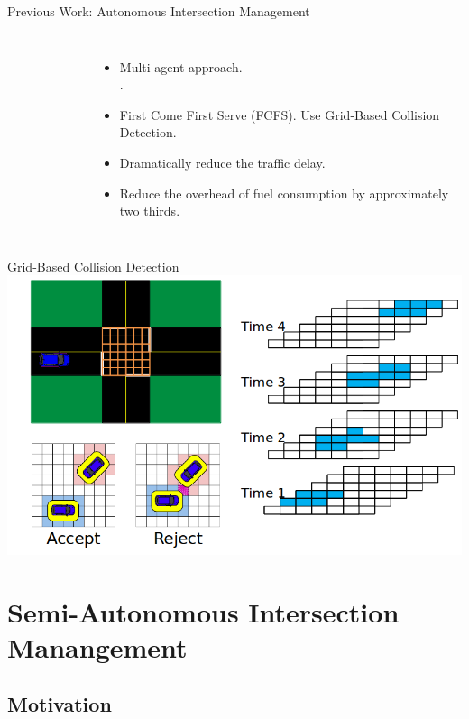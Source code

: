 \documentclass{beamer}
\begin{document}
\begin{frame}{Previous Work: Autonomous Intersection Management}
\begin{columns}[c]
		\begin{center}
		\begin{figure}
		\end{figure}
		\end{center}
				
		\begin{itemize}
		\item Multi-agent approach.\\\cite{bib:Dresner08Multiagent}.
		\item First Come First Serve (FCFS). Use Grid-Based Collision Detection.\pause
		\item Dramatically reduce the traffic delay.
		\item Reduce the overhead of fuel consumption by approximately
		two thirds.
		\end{itemize}
\end{columns}
\end{frame}

\begin{frame}{Grid-Based Collision Detection}
	\includegraphics[width=\textwidth]{grids.png}
\end{frame}

\section{Semi-Autonomous Intersection Manangement}

\subsection{Motivation}
\end{document}
